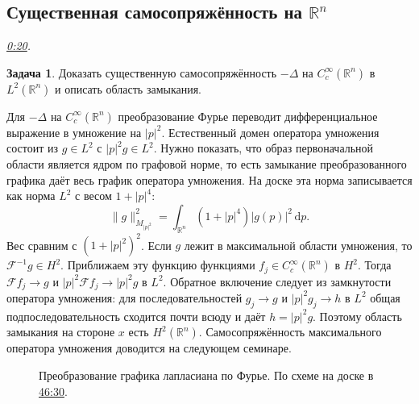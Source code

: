 \documentclass[11pt,a4paper]{article}
\theoremstyle{plain}
\theoremstyle{definition}
\newtheorem{exercise}[theorem]{Задача}
\newcommand{\RR}{\mathbb R}
\newcommand{\dd}{\,\mathrm d}
\newcommand{\abs}[1]{\lvert#1\rvert}
\newcommand{\norm}[1]{\lVert#1\rVert}
\newcommand{\sch}[1]{C_c^\infty(#1)}
\newcommand{\at}[3]{\href{https://www.youtube.com/watch?v=#1&t=#2s}{#3}}
\newcommand{\topic}[2]{\Needspace{5\baselineskip}\subsection*{#1}\noindent\emph{#2.}\par\nobreak\smallskip}
\begin{document}
\topic{Существенная самосопряжённость на $\RR^n$}{\at{oDIn4ERoCkc}{20}{0:20}}
\begin{exercise}
Доказать существенную самосопряжённость $-\Delta$
на $\sch{\RR^n}$ в $L^2(\RR^n)$ и описать область
замыкания.
\end{exercise}
Для $-\Delta$ на $\sch{\RR^n}$ преобразование Фурье
переводит дифференциальное выражение в умножение на $\abs p^2$.
Естественный домен оператора умножения состоит из
$g\in L^2$ с $\abs p^2g\in L^2$. Нужно показать, что образ
первоначальной области является ядром по графовой норме,
то есть замыкание преобразованного графика даёт весь
график оператора умножения. На доске эта норма записывается
как норма $L^2$ с весом $1+\abs p^4$:
\[
 \norm g_{M_{|p|^2}}^2=\int_{\RR^n}(1+|p|^4)|g(p)|^2\dd p .
\]
Вес сравним с $(1+|p|^2)^2$. Если $g$ лежит
в максимальной области умножения, то
$\mathcal F^{-1}g\in H^2$. Приближаем эту функцию
функциями $f_j\in\sch{\RR^n}$ в $H^2$.
Тогда $\mathcal Ff_j\to g$ и
$|p|^2\mathcal Ff_j\to |p|^2g$ в $L^2$.
Обратное включение следует из замкнутости
оператора умножения: для последовательностей
$g_j\to g$ и $|p|^2g_j\to h$ в $L^2$ общая
подпоследовательность сходится почти всюду и
даёт $h=|p|^2g$. Поэтому область замыкания
на стороне $x$ есть $H^2(\RR^n)$.
Самосопряжённость максимального оператора умножения
доводится на следующем семинаре.

\begin{figure}[ht]
\centering
{}
\caption{Преобразование графика лапласиана по Фурье.
По схеме на доске в \at{oDIn4ERoCkc}{2790}{46:30}.}
\end{figure}
\end{document}
